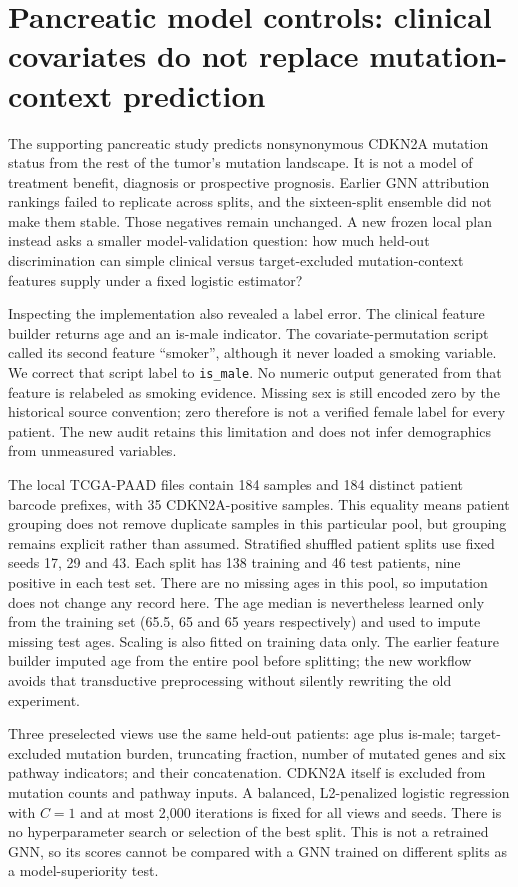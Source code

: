 \section{Pancreatic model controls: clinical covariates do not replace mutation-context prediction}
The supporting pancreatic study predicts nonsynonymous CDKN2A mutation status from the rest of the tumor's mutation landscape. It is not a model of treatment benefit, diagnosis or prospective prognosis. Earlier GNN attribution rankings failed to replicate across splits, and the sixteen-split ensemble did not make them stable. Those negatives remain unchanged. A new frozen local plan instead asks a smaller model-validation question: how much held-out discrimination can simple clinical versus target-excluded mutation-context features supply under a fixed logistic estimator?

Inspecting the implementation also revealed a label error. The clinical feature builder returns age and an is-male indicator. The covariate-permutation script called its second feature ``smoker'', although it never loaded a smoking variable. We correct that script label to \texttt{is\_male}. No numeric output generated from that feature is relabeled as smoking evidence. Missing sex is still encoded zero by the historical source convention; zero therefore is not a verified female label for every patient. The new audit retains this limitation and does not infer demographics from unmeasured variables.

The local TCGA-PAAD files contain 184 samples and 184 distinct patient barcode prefixes, with 35 CDKN2A-positive samples. This equality means patient grouping does not remove duplicate samples in this particular pool, but grouping remains explicit rather than assumed. Stratified shuffled patient splits use fixed seeds 17, 29 and 43. Each split has 138 training and 46 test patients, nine positive in each test set. There are no missing ages in this pool, so imputation does not change any record here. The age median is nevertheless learned only from the training set (65.5, 65 and 65 years respectively) and used to impute missing test ages. Scaling is also fitted on training data only. The earlier feature builder imputed age from the entire pool before splitting; the new workflow avoids that transductive preprocessing without silently rewriting the old experiment.

Three preselected views use the same held-out patients: age plus is-male; target-excluded mutation burden, truncating fraction, number of mutated genes and six pathway indicators; and their concatenation. CDKN2A itself is excluded from mutation counts and pathway inputs. A balanced, L2-penalized logistic regression with $C=1$ and at most 2,000 iterations is fixed for all views and seeds. There is no hyperparameter search or selection of the best split. This is not a retrained GNN, so its scores cannot be compared with a GNN trained on different splits as a model-superiority test.

